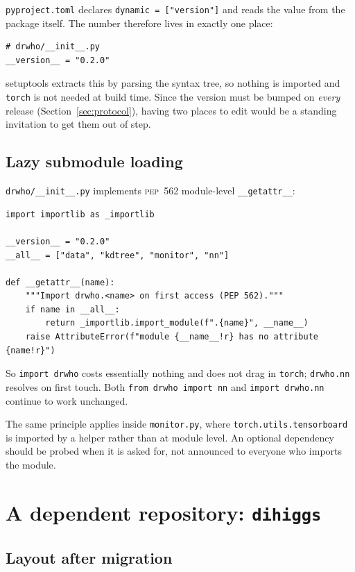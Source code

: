 \documentclass[11pt,a4paper]{article}
\newcommand{\pkg}[1]{\texttt{#1}}
\begin{document}
\texttt{pyproject.toml} declares \texttt{dynamic = ["version"]} and reads the
value from the package itself. The number therefore lives in exactly one place:

\begin{lstlisting}[style=py]
# drwho/__init__.py
__version__ = "0.2.0"
\end{lstlisting}

setuptools extracts this by parsing the syntax tree, so nothing is imported and
\pkg{torch} is not needed at build time. Since the version must be bumped on
\emph{every} release (Section~\ref{sec:protocol}), having two places to edit
would be a standing invitation to get them out of step.

\subsection{Lazy submodule loading}

\texttt{drwho/\_\_init\_\_.py} implements \textsc{pep}~562 module-level
\texttt{\_\_getattr\_\_}:

\begin{lstlisting}[style=py]
import importlib as _importlib

__version__ = "0.2.0"
__all__ = ["data", "kdtree", "monitor", "nn"]

def __getattr__(name):
    """Import drwho.<name> on first access (PEP 562)."""
    if name in __all__:
        return _importlib.import_module(f".{name}", __name__)
    raise AttributeError(f"module {__name__!r} has no attribute {name!r}")
\end{lstlisting}

So \texttt{import drwho} costs essentially nothing and does not drag in
\pkg{torch}; \texttt{drwho.nn} resolves on first touch. Both
\texttt{from drwho import nn} and \texttt{import drwho.nn} continue to work
unchanged.

The same principle applies inside \texttt{monitor.py}, where
\texttt{torch.utils.tensorboard} is imported by a helper rather than at module
level. An optional dependency should be probed when it is asked for, not
announced to everyone who imports the module.

\section{A dependent repository: \texttt{dihiggs}}

\subsection{Layout after migration}
\end{document}
